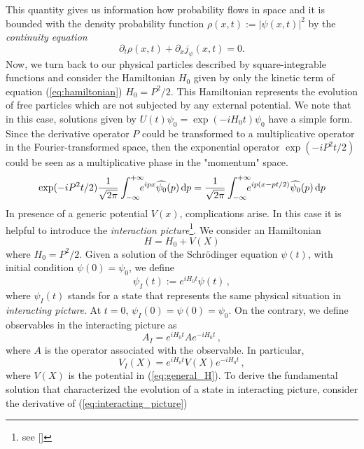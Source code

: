 This quantity gives us information how probability flows in space and it is bounded with the density probability function $\rho(x,t):=|\psi(x,t)|^2$ by the \textit{continuity equation}
\begin{equation}
	\partial_t\rho(x,t)+\partial_x j_\psi(x,t)=0.
\end{equation}
Now, we turn back to our physical particles described by square-integrable functions and consider the Hamiltonian $H_0$ given by only the kinetic term of equation (\ref{eq:hamiltonian}) $H_0=P^2/2$. This Hamiltonian represents the evolution of free particles which are not subjected by any external potential. We note that in this case, solutions given by $U(t)\psi_0=\exp(-iH_0t)\psi_0$ have a simple form. Since the derivative operator $P$ could be transformed to a multiplicative operator in the Fourier-transformed space, then the exponential operator $\exp(-iP^2t/2)$ could be seen as a multiplicative phase in the "momentum" space.
\begin{equation}
	\exp(-iP^2t/2)\frac{1}{\sqrt{2\pi}}\int_{-\infty}^{+\infty}\nspace\! e^{ipx}\hat{\psi_0}(p)\, \dd p=\frac{1}{\sqrt{2\pi}}\int_{-\infty}^{+\infty}\nspace\! e^{ip(x-pt/2)}\hat{\psi_0}(p)\, \dd p
\end{equation} 
In presence of a generic potential $V(x)$, complications arise. In this case it is helpful to introduce the \textit{interaction picture}\footnote{see [\citealp[Chap. 5, Sect. 5]{sakurai}]}.
We consider an Hamiltonian
\begin{equation}
	H=H_0+V(X)
	\label{eq:general_H}
\end{equation}
where $H_0=P^2/2$. Given a solution of the Schr\"{o}dinger equation $\psi(t)$, with initial condition $\psi(0)=\psi_0$, we define
\begin{equation}
	\psi_I(t):=e^{iH_0t}\psi(t)\, ,
	\label{eq:interacting_picture}
\end{equation}
where $\psi_I(t)$ stands for a state that represents the same physical situation in \textit{interacting picture}. At $t=0$, $\psi_I(0)=\psi(0)=\psi_0$. On the contrary, we define observables in the interacting picture as
\begin{equation}
 A_I=e^{iH_0t}Ae^{-iH_0t}\, ,
\end{equation}
where $A$ is the operator associated with the observable. In particular,
\begin{equation}
	V_I(X)=e^{iH_0t}V(X)e^{-iH_0t}\,,
\end{equation}
where $V(X)$ is the potential in (\ref{eq:general_H}). To derive the fundamental solution that characterized the evolution of a state in interacting picture, consider the derivative of (\ref{eq:interacting_picture})
